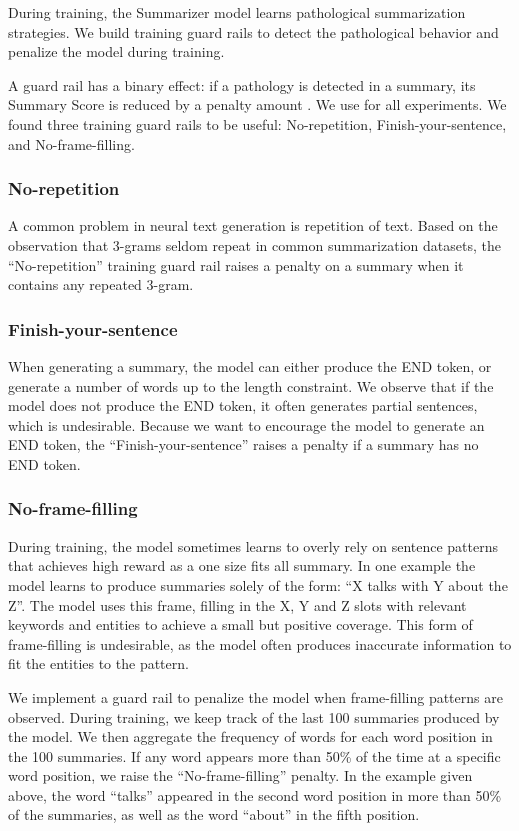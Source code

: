 \documentclass[11pt,a4paper]{article}
\begin{document}
During training, the Summarizer model learns pathological summarization strategies. We build training guard rails to detect the pathological behavior and penalize the model during training.

A guard rail has a binary effect: if a pathology is detected in a summary, its Summary Score is reduced by a penalty amount . We use  for all experiments. We found three training guard rails to be useful: No-repetition, Finish-your-sentence, and No-frame-filling.

\subsubsection{No-repetition}

A common problem in neural text generation is repetition of text. Based on the observation that 3-grams seldom repeat in common summarization datasets, the ``No-repetition'' training guard rail raises a penalty on a summary when it contains any repeated 3-gram.

\subsubsection{Finish-your-sentence}

When generating a summary, the model can either produce the END token, or generate a number of words up to the length constraint. We observe that if the model does not produce the END token, it often generates partial sentences, which is undesirable. Because we want to encourage the model to generate an END token, the ``Finish-your-sentence'' raises a penalty if a summary has no END token.

\subsubsection{No-frame-filling}

During training, the model sometimes learns to overly rely on sentence patterns that achieves high reward as a one size fits all summary. In one example the model learns to produce summaries solely of the form: ``X talks with Y about the Z''. The model uses this frame, filling in the X, Y and Z slots with relevant keywords and entities to achieve a small but positive coverage. This form of frame-filling is undesirable, as the model often produces inaccurate information to fit the entities to the pattern.

We implement a guard rail to penalize the model when frame-filling patterns are observed. During training, we keep track of the last 100 summaries produced by the model. We then aggregate the frequency of words for each word position in the 100 summaries. If any word appears more than 50\% of the time at a specific word position, we raise the ``No-frame-filling'' penalty. In the example given above, the word ``talks'' appeared in the second word position in more than 50\% of the summaries, as well as the word ``about'' in the fifth position.
\end{document}
